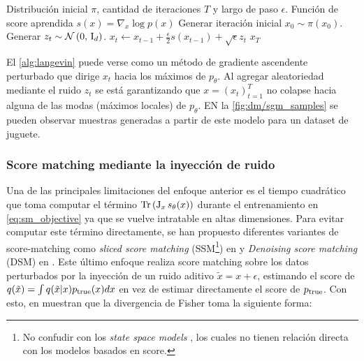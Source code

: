 \begin{algorithm}
    \caption{Langevin sampling}
    \label{alg:langevin}
    \begin{algorithmic}[1]
        \Require Distribución inicial $\pi$, cantidad de iteraciones $T$ y largo de paso $\epsilon$.
        \Require Función de score aprendida $s(x) = \nabla_x \log p(x)$
        \State Generar iteración inicial $x_0\sim \pi(x_0)$.
        \State Generar $z_t\sim \mathcal{N}\left(0,\,\operatorname{I}_{d}\right)$.
        \State $x_t\gets x_{t-1} + \frac{\epsilon}{2}s(x_{t-1}) + \sqrt{\epsilon} z_t$
        \EndFor
        \State\Return $x_T$
    \end{algorithmic}
\end{algorithm}

El \autoref{alg:langevin} puede verse como un método de gradiente ascendente perturbado que dirige $x_t$ hacia los máximos de $p_\theta$. Al agregar aleatoriedad mediante el ruido $z_t$ se está garantizando que $x=(x_t)_{t=1}^T$ no colapse hacia alguna de las modas (máximos locales) de $p_\theta$. EN la \autoref{fig:dm/sgm_samples} se pueden observar muestras generadas a partir de este modelo para un dataset de juguete.


\subsubsection{Score matching mediante la inyección de ruido}

Una de las principales limitaciones del enfoque anterior es el tiempo cuadrático que toma computar el término $\operatorname{Tr}\left(\operatorname{J}_x s_\theta(x)\right)$ durante el entrenamiento en \eqref{eq:sm_objective} ya que se vuelve intratable en altas dimensiones. Para evitar computar este término directamente, se han propuesto diferentes variantes de score-matching como \textit{sliced score matching} (SSM\footnote{No confudir con los \textit{state space models} \cite{gu2022efficientlymodelinglongsequences}, los cuales no tienen relación directa con los modelos basados en score.}) en \cite{song2019sliced} y \textit{Denoising score matching} (DSM) en \cite{DSM}. Este último enfoque realiza score matching sobre los datos perturbados por la inyección de un ruido aditivo $\tilde{x} = x+\epsilon$, estimando el score de $q(\tilde{x})=\int q(\tilde{x}|x)p_{\operatorname{true}}(x)dx$ en vez de estimar directamente el score de $p_{\operatorname{true}}$. Con esto, en \cite{DSM} muestran que la divergencia de Fisher toma la siguiente forma:

